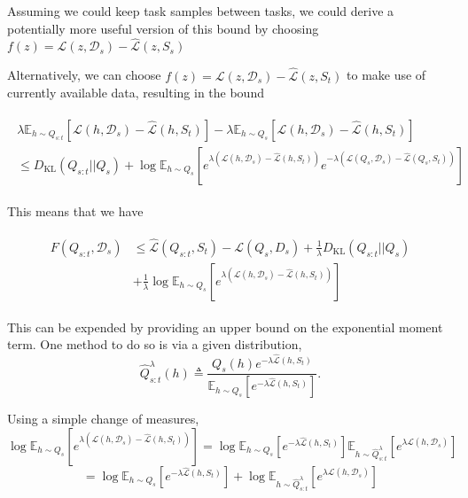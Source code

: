 \documentclass[letterpaper]{article}
\theoremstyle{definition}
\begin{document}
Assuming we could keep task samples between tasks, we could derive a potentially more useful version of this bound by choosing $f(z)=\mathcal{L}(z,\mathcal{D}_s)-\hat{\mathcal{L}}(z,S_s)$ %

Alternatively, we can choose $f(z)=\mathcal{L}(z,\mathcal{D}_s)-\hat{\mathcal{L}}(z,S_t)$ to make use of currently available data, resulting in the bound 


\begin{align*}
\begin{split}
\lambda\mathbb{E}_{h\sim Q_{s:t}}\left [\mathcal{L}(h,\mathcal{D}_s)-\hat{\mathcal{L}}(h,S_t) \right ] - \lambda\mathbb{E}_{h\sim Q_{s}}\left [\mathcal{L}(h,\mathcal{D}_s)-\hat{\mathcal{L}}(h,S_t) \right ] \\
\leq D_{\mathrm{KL}}(Q_{s:t}||Q_{s})+\log\mathbb{E}_{h\sim Q_{s}}\left [e^{\lambda(\mathcal{L}(h,\mathcal{D}_s)-\hat{\mathcal{L}}(h,S_t))}e^{-\lambda(\mathcal{L}(Q_s,\mathcal{D}_s)-\hat{\mathcal{L}}(Q_s,S_t))} \right ]
\end{split}
\end{align*}

This means that we have

\begin{align} \label{eq:forget-base}
\begin{split}
F(Q_{s:t},\mathcal{D}_s) &\leq \hat{\mathcal{L}}(Q_{s:t}, S_t) - \mathcal{L}(Q_{s}, D_s) + \frac{1}{\lambda} D_{\mathrm{KL}}(Q_{s:t}||Q_{s})\\
&+\frac{1}{\lambda}\log\mathbb{E}_{h\sim Q_{s}}\left [e^{\lambda(\mathcal{L}(h,\mathcal{D}_s)-\hat{\mathcal{L}}(h,S_t))} \right ]
\end{split}
\end{align}

This can be expended by providing an upper bound on the exponential moment term.
One method to do so is via a given distribution, $$\hat{Q}_{s:t}^{\lambda}(h)\triangleq\frac{Q_s(h)e^{-\lambda\hat{\mathcal{L}}(h,S_t)}}{\mathbb{E}_{h\sim Q_s}\left [e^{-\lambda\hat{\mathcal{L}}(h,S_t)} \right ]}.$$

Using a simple change of measures, 
$$\log\mathbb{E}_{h\sim Q_{s}}\left [e^{\lambda(\mathcal{L}(h,\mathcal{D}_s)-\hat{\mathcal{L}}(h,S_t))} \right ]=\log \mathbb{E}_{h\sim Q_s}\left [e^{-\lambda\hat{\mathcal{L}}(h,S_t)} \right ] \mathbb{E}_{h\sim \hat{Q}_{s:t}^{\lambda}}\left [e^{\lambda\mathcal{L}(h,\mathcal{D}_s)} \right ]$$
$$=\log \mathbb{E}_{h\sim Q_s}\left [e^{-\lambda\hat{\mathcal{L}}(h,S_t)} \right ]+\log \mathbb{E}_{h\sim \hat{Q}_{s:t}^{\lambda}}\left [e^{\lambda\mathcal{L}(h,\mathcal{D}_s)} \right ]$$
\end{document}
